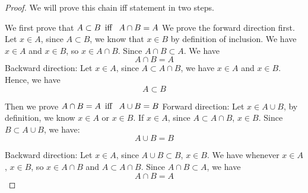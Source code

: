             \begin{proof}
            We will prove this chain iff statement in two steps.
            
            We first prove that $A \subset B \hspace{5pt} \text{\normalfont iff } \hspace{5pt} A \cap B = A$
            We prove the forward direction first. 
            Let $x \in A$, since $A \subset B$, we know that $x \in B$ by definition of inclusion. We have $x \in A$ and $x \in B$, so $x \in A \cap B$. Since $A \cap B \subset A$. We have $$A \cap B = A$$
            Backward direction: 
            Let $x \in A$, since $A \subset A \cap B$, we have $x \in A$ and $x \in B$. Hence, we have $$A \subset B$$
            
            Then we prove $A \cap B = A \hspace{5pt} \text{\normalfont iff } \hspace{5pt} A \cup B = B$
            Forward direction: 
            Let $x \in A \cup B$, by definition, we know $x \in A$ or $x \in B$. If $x \in A$, since $A \subset A \cap B$, $x \in B$. Since $B \subset A \cup B$, we have: $$A \cup B = B$$
            
            Backward direction:
            Let $x \in A$, since $A \cup B \subset B$, $x \in B$. We have whenever $x \in A$, $x \in B$, so $x \in A \cap B$ and $A \subset A \cap B$. Since $A \cap B \subset A$, we have $$A \cap B = A$$
            \end{proof}            
            
